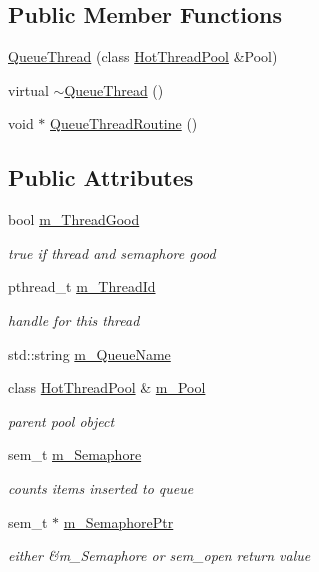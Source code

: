 \subsection*{Public Member Functions}
\begin{DoxyCompactItemize}
\item 
\hyperlink{structleveldb_1_1_queue_thread_a3aae484a03152cb64bca716cf2f6fa34}{Queue\+Thread} (class \hyperlink{classleveldb_1_1_hot_thread_pool}{Hot\+Thread\+Pool} \&Pool)
\item 
virtual \hyperlink{structleveldb_1_1_queue_thread_affd97f2c367cb4859d2369bd4e696ebd}{$\sim$\+Queue\+Thread} ()
\item 
void $\ast$ \hyperlink{structleveldb_1_1_queue_thread_a4ff595ae14d6502e080621be96cd30a9}{Queue\+Thread\+Routine} ()
\end{DoxyCompactItemize}
\subsection*{Public Attributes}
\begin{DoxyCompactItemize}
\item 
bool \hyperlink{structleveldb_1_1_queue_thread_afa80b76fb1ae354d8b1123f7f1c2a171}{m\+\_\+\+Thread\+Good}
\begin{DoxyCompactList}\small\item\em true if thread and semaphore good \end{DoxyCompactList}\item 
pthread\+\_\+t \hyperlink{structleveldb_1_1_queue_thread_aea8d3c3f7c5d97e2b72e8500ba02a716}{m\+\_\+\+Thread\+Id}
\begin{DoxyCompactList}\small\item\em handle for this thread \end{DoxyCompactList}\item 
std\+::string \hyperlink{structleveldb_1_1_queue_thread_ad232678ff8b15ad8be50cb5a0e68fa07}{m\+\_\+\+Queue\+Name}
\item 
class \hyperlink{classleveldb_1_1_hot_thread_pool}{Hot\+Thread\+Pool} \& \hyperlink{structleveldb_1_1_queue_thread_a7e5f6e3e8b24a4698b775dcd9caa9726}{m\+\_\+\+Pool}
\begin{DoxyCompactList}\small\item\em parent pool object \end{DoxyCompactList}\item 
sem\+\_\+t \hyperlink{structleveldb_1_1_queue_thread_a697f7c0aaeb5e776cf1de59476ec2005}{m\+\_\+\+Semaphore}
\begin{DoxyCompactList}\small\item\em counts items inserted to queue \end{DoxyCompactList}\item 
sem\+\_\+t $\ast$ \hyperlink{structleveldb_1_1_queue_thread_a0dc37975600c8018e85f7d7edfebccd7}{m\+\_\+\+Semaphore\+Ptr}
\begin{DoxyCompactList}\small\item\em either \&m\+\_\+\+Semaphore or sem\+\_\+open return value \end{DoxyCompactList}\end{DoxyCompactItemize}
